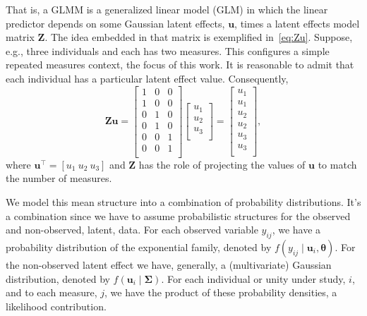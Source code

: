 That is, a GLMM is a generalized linear model (GLM) in which the linear
predictor depends on some Gaussian latent effects, \(\mathbf{u}\), times
a latent effects model matrix \(\mathbf{Z}\). The idea embedded in that
matrix is exemplified in~\autoref{eq:Zu}. Suppose, e.g., three
individuals and each has two measures. This configures a simple repeated
measures context, the focus of this work. It is reasonable to admit that
each individual has a particular latent effect value. Consequently,
\begin{equation}
  \mathbf{Zu} = \begin{bmatrix}
                 1 & 0 & 0\\
                 1 & 0 & 0\\
                 0 & 1 & 0\\
                 0 & 1 & 0\\
                 0 & 0 & 1\\
                 0 & 0 & 1\\
                \end{bmatrix} \begin{bmatrix}
                               u_{1}\\
                               u_{2}\\
                               u_{3}\\
                              \end{bmatrix} = \begin{bmatrix}
                                               u_{1}\\
                                               u_{1}\\
                                               u_{2}\\
                                               u_{2}\\
                                               u_{3}\\
                                               u_{3}\\
                                              \end{bmatrix},
  \label{eq:Zu}
\end{equation}
where \(\mathbf{u}^{\top} = [u_{1}~u_{2}~u_{3}]\) and \(\mathbf{Z}\) has
the role of projecting the values of \(\mathbf{u}\) to match the number
of measures.

We model this mean structure into a combination of probability
distributions. It's a combination since we have to assume probabilistic
structures for the observed and non-observed, latent, data. For each
observed variable \(y_{ij}\), we have a probability distribution of the
exponential family, denoted by \(f(y_{ij} \mid \mathbf{u}_{i},
\bm{\theta})\). For the non-observed latent effect we have, generally, a
(multivariate) Gaussian distribution, denoted by \(f(\mathbf{u}_{i} \mid
\bm{\Sigma})\). For each individual or unity under study, \(i\), and to
each measure, \(j\), we have the product of these probability densities,
a likelihood contribution.

